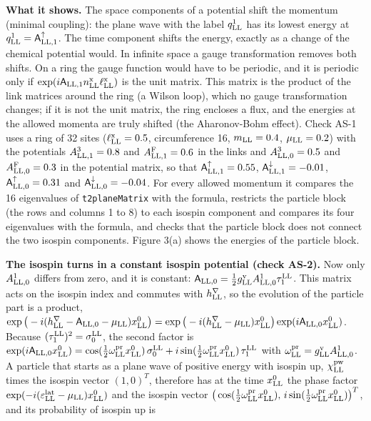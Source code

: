\documentclass[
  10pt,
]{article}
\begin{document}
\textbf{What it shows.} The space components of a potential shift the
momentum (minimal coupling): the plane wave with the label
\(q^1_{\rm LL}\) has its lowest energy at
\(q^1_{\rm LL}=\mathsf A^\uparrow_{{\rm LL},1}\). The time component
shifts the energy, exactly as a change of the chemical potential would.
In infinite space a gauge transformation removes both shifts. On a ring
the gauge function would have to be periodic, and it is periodic only if
\(\exp(i\mathsf A_{{\rm LL},1}n^{\rm x}_{\rm LL}\ell^{\rm x}_{\rm LL})\)
is the unit matrix. This matrix is the product of the link matrices
around the ring (a Wilson loop), which no gauge transformation changes;
if it is not the unit matrix, the ring encloses a flux, and the energies
at the allowed momenta are truly shifted (the Aharonov-Bohm effect).
Check AS-1 uses a ring of 32 sites (\(\ell^{\rm x}_{\rm LL}=0.5\),
circumference 16, \(m_{\rm LL}=0.4\), \(\mu_{\rm LL}=0.2\)) with the
potentials \(A^3_{{\rm LL},1}=0.8\) and \(A^{\rm F}_{{\rm LL},1}=0.6\)
in the links and \(A^3_{{\rm LL},0}=0.5\) and
\(A^{\rm F}_{{\rm LL},0}=0.3\) in the potential matrix, so that
\(\mathsf A^\uparrow_{{\rm LL},1}=0.55\),
\(\mathsf A^\downarrow_{{\rm LL},1}=-0.01\),
\(\mathsf A^\uparrow_{{\rm LL},0}=0.31\) and
\(\mathsf A^\downarrow_{{\rm LL},0}=-0.04\). For every allowed momentum
it compares the 16 eigenvalues of \texttt{t2planeMatrix} with the
formula, restricts the particle block (the rows and columns 1 to 8) to
each isospin component and compares its four eigenvalues with the
formula, and checks that the particle block does not connect the two
isospin components. Figure 3(a) shows the energies of the particle
block.

\textbf{The isospin turns in a constant isospin potential (check AS-2).}
Now only \(A^1_{{\rm LL},0}\) differs from zero, and it is constant:
\(\mathsf A_{{\rm LL},0}=\tfrac12g^{\rm v}_{\rm LL}A^1_{{\rm LL},0}\tau^{\rm LL}_1\).
This matrix acts on the isospin index and commutes with
\(h^\nabla_{\rm LL}\), so the evolution of the particle part is a
product,
\(\exp\big(-i(h^\nabla_{\rm LL}-\mathsf A_{{\rm LL},0}-\mu_{\rm LL})x^0_{\rm LL}\big)=\exp\big(-i(h^\nabla_{\rm LL}-\mu_{\rm LL})x^0_{\rm LL}\big)\exp(i\mathsf A_{{\rm LL},0}x^0_{\rm LL})\).
Because \((\tau^{\rm LL}_1)^2=\sigma^{\rm LL}_0\), the second factor is
\(\exp(i\mathsf A_{{\rm LL},0}x^0_{\rm LL})=\cos(\tfrac12\omega^{\rm pr}_{\rm LL}x^0_{\rm LL})\,\sigma^{\rm LL}_0+i\sin(\tfrac12\omega^{\rm pr}_{\rm LL}x^0_{\rm LL})\,\tau^{\rm LL}_1\)
with \(\omega^{\rm pr}_{\rm LL}=g^{\rm v}_{\rm LL}A^1_{{\rm LL},0}\). A
particle that starts as a plane wave of positive energy with isospin up,
\(\chi^{\rm pw}_{\rm LL}\) times the isospin vector \((1,0)^T\),
therefore has at the time \(x^0_{\rm LL}\) the phase factor
\(\exp(-i(\varepsilon^{\rm lat}_{\rm LL}-\mu_{\rm LL})x^0_{\rm LL})\)
and the isospin vector
\(\big(\cos(\tfrac12\omega^{\rm pr}_{\rm LL}x^0_{\rm LL}),\,i\sin(\tfrac12\omega^{\rm pr}_{\rm LL}x^0_{\rm LL})\big)^T\),
and its probability of isospin up is
\end{document}
